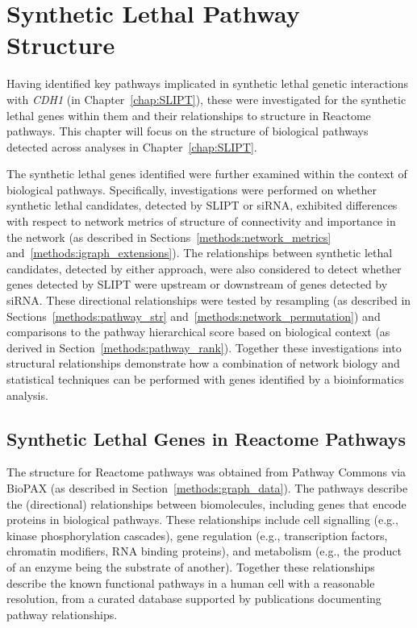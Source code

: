 \chapter{Synthetic Lethal Pathway Structure}
\label{chap:Pathways}
  
Having identified key pathways implicated in \gls{synthetic lethal} genetic interactions with \textit{CDH1} (in Chapter~\ref{chap:SLIPT}), these were investigated for the \gls{synthetic lethal} genes within them and their relationships to  structure in Reactome pathways. This chapter will focus on the  structure of biological pathways detected across analyses in Chapter~\ref{chap:SLIPT}. 

The \gls{synthetic lethal} genes identified were further examined within the context of biological pathways. Specifically, investigations were performed on whether \gls{synthetic lethal} candidates, detected by \gls{SLIPT} or \gls{siRNA}, exhibited differences with respect to network metrics of  structure of connectivity and importance in the network (as described in Sections~\ref{methods:network_metrics} and~\ref{methods:igraph_extensions}). The relationships between \gls{synthetic lethal} candidates, detected by either approach, were also considered to detect whether genes detected by \gls{SLIPT} were upstream or downstream of genes detected by \gls{siRNA}. These directional relationships were tested by resampling (as described in Sections~\ref{methods:pathway_str} and~\ref{methods:network_permutation}) and comparisons to the pathway hierarchical score based on biological context (as derived in Section~\ref{methods:pathway_rank}). 
%
Together these investigations into structural relationships demonstrate how a combination of network biology and statistical techniques can be performed with genes identified by a \gls{bioinformatics} analysis.

\FloatBarrier

\section{Synthetic Lethal Genes in Reactome Pathways} \label{chapt4:SL_Genes}

\FloatBarrier

The  structure for Reactome pathways was obtained from Pathway Commons via \gls{BioPAX} (as described in Section~\ref{methods:graph_data}). The pathways describe the (directional) relationships between biomolecules, including genes that encode proteins in biological pathways. These relationships include cell signalling (e.g., kinase phosphorylation cascades), gene regulation (e.g., transcription factors, chromatin modifiers, \acrshort{RNA} binding proteins), and metabolism (e.g., the product of an enzyme being the substrate of another). Together these relationships describe the known functional pathways in a human cell with a reasonable resolution, from a curated database supported by publications documenting pathway relationships. 

